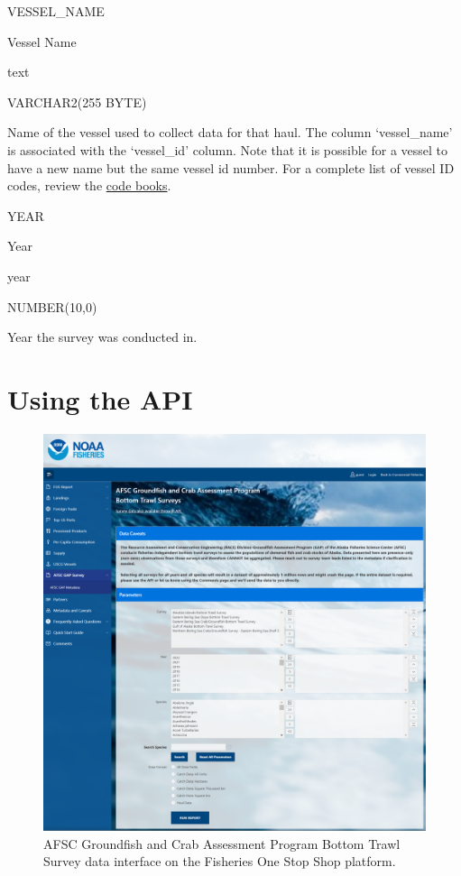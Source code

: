 \documentclass[
  letterpaper,
  oneside,
  open=any]{scrbook}
\begin{document}
VESSEL\_NAME

Vessel Name

text

VARCHAR2(255 BYTE)

Name of the vessel used to collect data for that haul. The column
`vessel\_name' is associated with the `vessel\_id' column. Note that it
is possible for a vessel to have a new name but the same vessel id
number. For a complete list of vessel ID codes, review the
\href{https://www.fisheries.noaa.gov/resource/document/groundfish-survey-species-code-manual-and-data-codes-manual}{code
books}.

YEAR

Year

year

NUMBER(10,0)

Year the survey was conducted in.

\hypertarget{using-the-api}{%
\chapter{Using the API}\label{using-the-api}}

\begin{figure}

{\centering \includegraphics[width=6.24in,height=\textheight]{content/../img/foss_1_interface.png}

}

\caption{AFSC Groundfish and Crab Assessment Program Bottom Trawl Survey
data interface on the Fisheries One Stop Shop platform.}

\end{figure}
\end{document}
